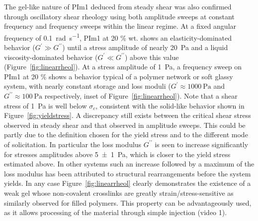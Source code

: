 \documentclass[prl,a4paper,twocolumn,superscriptaddress,showkeys]{revtex4}
\begin{document}
The gel-like nature of PIm1 deduced from steady shear was also confirmed through oscillatory shear rheology using both amplitude sweeps at constant frequency and frequency sweeps within the linear regime. At a fixed angular frequency of \SI{0.1}{\radian\per\second}, PIm1 at 20 \% wt. shows an elasticity-dominated behavior ($G^\prime\gg G^{\prime\prime}$) until a stress amplitude of nearly \SI{20}{\pascal} and a liquid viscosity-dominated behavior ($G^\prime\ll G^{\prime\prime}$) above this value (Figure~\ref{fig:linearrheol}). At a stress amplitude of \SI{1}{\pascal}, a frequency sweep on PIm1 at 20 \% shows a behavior typical of a polymer network or soft glassy system\cite{Larson1999}, with nearly constant storage and loss moduli ($G^\prime\approx \SI{1000}{\pascal}$ and $G^{\prime\prime} \approx \SI{100}{\pascal}$ respectively, inset of Figure~\ref{fig:linearrheol}). Note that a shear stress of \SI{1}{\pascal} is well below $\sigma_c$, consistent with the solid-like behavior shown in Figure~\ref{fig:yieldstress}. A discrepancy still exists between the critical shear stress observed in steady shear and that observed in amplitude sweeps. This could be partly due to the definition chosen for the yield stress and to the different mode of solicitation\cite{Coussot2014}. In particular the loss modulus $G^{\prime\prime}$ is seen to increase significantly for stresses amplitudes above \SI{5+-1}{\pascal}, which is closer to the yield stress estimated above. In other systems such an increase followed by a maximum of the loss modulus has been attributed to structural rearrangements before the system yields\cite{Hyun2011}. In any case Figure~\ref{fig:linearrheol} clearly demonstrates the existence of a weak gel whose non-covalent crosslinks are greatly strain/stress-sensitive as similarly observed for filled polymers\cite{Harwood1965}. This property can be advantageously used, as it allows processing of the material through simple injection (video 1).
\end{document}
